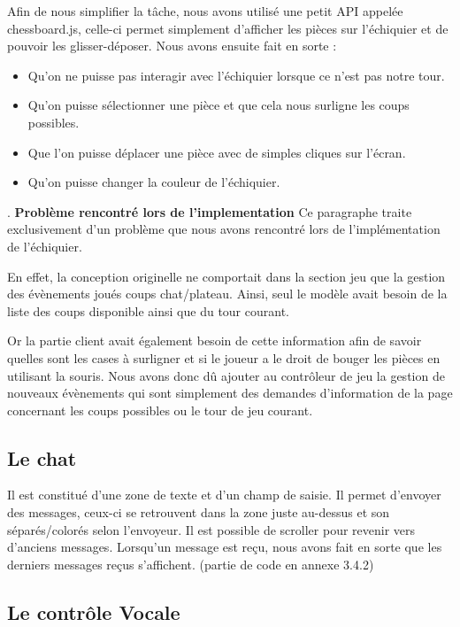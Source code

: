\documentclass[12pt, openany]{report}
\begin{document}
Afin de nous simplifier la tâche, nous avons utilisé une petit API appelée chessboard.js, celle-ci permet simplement d'afficher les pièces sur l'échiquier et de pouvoir les glisser-déposer.
Nous avons ensuite fait en sorte :
\begin{itemize}
    \item Qu'on ne puisse pas interagir avec l'échiquier lorsque ce n'est pas notre tour.
    \item Qu'on puisse sélectionner une pièce et que cela nous surligne les coups possibles.
    \item Que l'on puisse déplacer une pièce avec de simples cliques sur l'écran.
    \item Qu'on puisse changer la couleur de l'échiquier.
\end{itemize}
.
\newline
\textbf{Problème rencontré lors de l'implementation}
\newline
Ce paragraphe traite exclusivement d'un problème que nous avons rencontré lors de l'implémentation de l'échiquier.

En effet, la conception originelle ne comportait dans la section jeu que la gestion des évènements joués coups chat/plateau. Ainsi, seul le modèle avait besoin de la liste des coups disponible ainsi que du tour courant.

Or la partie client avait également besoin de cette information afin de savoir quelles sont les cases à surligner et si le joueur a le droit de bouger les pièces en utilisant la souris.
Nous avons donc dû ajouter au contrôleur de jeu la gestion de nouveaux évènements qui sont simplement des demandes d'information de la page concernant les coups possibles ou le tour de jeu courant.


\subsection{Le chat}

Il est constitué d'une zone de texte et d'un champ de saisie. Il permet d'envoyer des messages, ceux-ci se retrouvent dans la zone juste au-dessus et son séparés/colorés selon l'envoyeur. Il est possible de scroller pour revenir vers d'anciens messages. Lorsqu'un message est reçu, nous avons fait en sorte que les derniers messages reçus s'affichent.
(partie de code en annexe 3.4.2)

\newpage
\subsection{Le contrôle Vocale}
\end{document}
